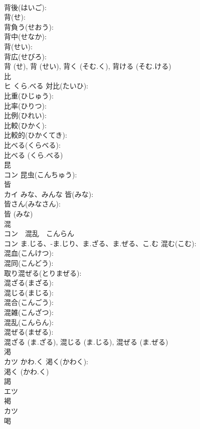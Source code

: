 \documentclass[8pt]{extreport}
\begin{document}
\begin{CJK}{UTF8}{min}
\\	背後(はいご): 
\\	背(せ): 
\\	背負う(せおう): 
\\	背中(せなか): 
\\	背(せい): 
\\	背広(せびろ): 
\\	背 (せ), 背 (せい), 背く (そむ.く), 背ける (そむ.ける)
\\	比			
\\	ヒ	くら.べる	対比(たいひ): 
\\	比重(ひじゅう): 
\\	比率(ひりつ): 
\\	比例(ひれい): 
\\	比較(ひかく): 
\\	比較的(ひかくてき): 
\\	比べる(くらべる): 
\\	比べる (くら.べる)
\\	昆			
\\	コン		昆虫(こんちゅう): 
\\	皆			
\\	カイ	みな、みんな	皆(みな): 
\\	皆さん(みなさん): 
\\	皆 (みな)
\\	混			
\\	コン　混乱　こんらん
\\	コン	ま.じる、-ま.じり、ま.ざる、ま.ぜる、こ.む	混む(こむ): 
\\	混血(こんけつ): 
\\	混同(こんどう): 
\\	取り混ぜる(とりまぜる): 
\\	混ざる(まざる): 
\\	混じる(まじる): 
\\	混合(こんごう): 
\\	混雑(こんざつ): 
\\	混乱(こんらん): 
\\	混ぜる(まぜる): 
\\	混ざる (ま.ざる), 混じる (ま.じる), 混ぜる (ま.ぜる)
\\	渇			
\\	カツ	かわ.く	渇く(かわく): 
\\	渇く (かわ.く)
\\	謁			
\\	エツ			
\\	褐			
\\	カツ			
\\	喝			

\end{CJK}
\end{document}
